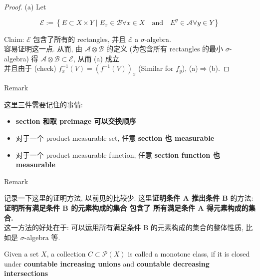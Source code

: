 \begin{proof}

(a) Let

\[\mathcal{E} := \left\{ {E \subset X \times Y \mid E_{x} \in \mathcal{B}\forall x \in X\quad\text{and}\quad E^{y} \in \mathcal{A}\forall y \in Y} \right\}\]

Claim: \(\mathcal{E}\) 包含了所有的 rectangles, 并且 \(\mathcal{E}\) a \(\sigma\)-algebra.\\
容易证明这一点. 从而, 由 \(\mathcal{A} \otimes \mathcal{B}\) 的定义 (为包含所有 rectangles 的最小 \(\sigma\)-algebra) 得 \(\mathcal{A} \otimes \mathcal{B} \subset \mathcal{E}\), 从而 (a) 成立\\
并且由于 (check) \(f_{x}^{- 1}(V) = (f^{- 1}(V))_{x}\) (Similar for \(f_{y}\)), (a)\(\Longrightarrow\)(b).

\end{proof}

\begin{qlremark}{Remark}

这里三件需要记住的事情:

\begin{itemize}
\item
  \textbf{section 和取 preimage 可以交换顺序}
\item
  对于一个 product measurable set, 任意 \textbf{section 也 measurable}
\item
  对于一个 product measurable function, 任意 \textbf{section function 也 measurable}
\end{itemize}

\end{qlremark}

\begin{qlremark}{Remark}

记录一下这里的证明方法, 以前见的比较少. 这里\textbf{证明条件 A 推出条件 B} 的方法: \textbf{证明所有满足条件 B 的元素构成的集合 包含了 所有满足条件 A 得元素构成的集合.}\\
这一方法的好处在于: 可以运用所有满足条件 B 的元素构成的集合的整体性质, 比如是 \(\sigma\)-algebra 等.

\end{qlremark}

\begin{definition}{}

Given a set \(X\), a collection \(C \subset \mathcal{P}(X)\) is called a monotone class, if it is closed under \textbf{countable increasing unions} and \textbf{countable decreasing intersections}

\end{definition}

